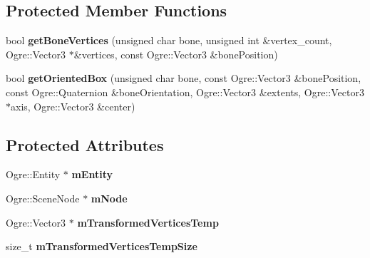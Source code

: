 \subsection*{Protected Member Functions}
\begin{DoxyCompactItemize}
\item 
\hypertarget{class_ogre_bullet_collisions_1_1_animated_mesh_to_shape_converter_a4d89a32d20322dc74579240779689573}{bool {\bfseries get\-Bone\-Vertices} (unsigned char bone, unsigned int \&vertex\-\_\-count, Ogre\-::\-Vector3 $\ast$\&vertices, const Ogre\-::\-Vector3 \&bone\-Position)}\label{class_ogre_bullet_collisions_1_1_animated_mesh_to_shape_converter_a4d89a32d20322dc74579240779689573}

\item 
\hypertarget{class_ogre_bullet_collisions_1_1_animated_mesh_to_shape_converter_ab2f46f4182bf24d3dad8a77c17514980}{bool {\bfseries get\-Oriented\-Box} (unsigned char bone, const Ogre\-::\-Vector3 \&bone\-Position, const Ogre\-::\-Quaternion \&bone\-Orientation, Ogre\-::\-Vector3 \&extents, Ogre\-::\-Vector3 $\ast$axis, Ogre\-::\-Vector3 \&center)}\label{class_ogre_bullet_collisions_1_1_animated_mesh_to_shape_converter_ab2f46f4182bf24d3dad8a77c17514980}

\end{DoxyCompactItemize}
\subsection*{Protected Attributes}
\begin{DoxyCompactItemize}
\item 
\hypertarget{class_ogre_bullet_collisions_1_1_animated_mesh_to_shape_converter_ad20b11e7c144a4b9198a18a6b05107d5}{Ogre\-::\-Entity $\ast$ {\bfseries m\-Entity}}\label{class_ogre_bullet_collisions_1_1_animated_mesh_to_shape_converter_ad20b11e7c144a4b9198a18a6b05107d5}

\item 
\hypertarget{class_ogre_bullet_collisions_1_1_animated_mesh_to_shape_converter_a4599877a3c3184c2a75668616ac638e9}{Ogre\-::\-Scene\-Node $\ast$ {\bfseries m\-Node}}\label{class_ogre_bullet_collisions_1_1_animated_mesh_to_shape_converter_a4599877a3c3184c2a75668616ac638e9}

\item 
\hypertarget{class_ogre_bullet_collisions_1_1_animated_mesh_to_shape_converter_a53c5f39e5ea92ac33e0e4b16a0896da3}{Ogre\-::\-Vector3 $\ast$ {\bfseries m\-Transformed\-Vertices\-Temp}}\label{class_ogre_bullet_collisions_1_1_animated_mesh_to_shape_converter_a53c5f39e5ea92ac33e0e4b16a0896da3}

\item 
\hypertarget{class_ogre_bullet_collisions_1_1_animated_mesh_to_shape_converter_a794b6ca934c798f46e5bd4b5fd421016}{size\-\_\-t {\bfseries m\-Transformed\-Vertices\-Temp\-Size}}\label{class_ogre_bullet_collisions_1_1_animated_mesh_to_shape_converter_a794b6ca934c798f46e5bd4b5fd421016}

\end{DoxyCompactItemize}


